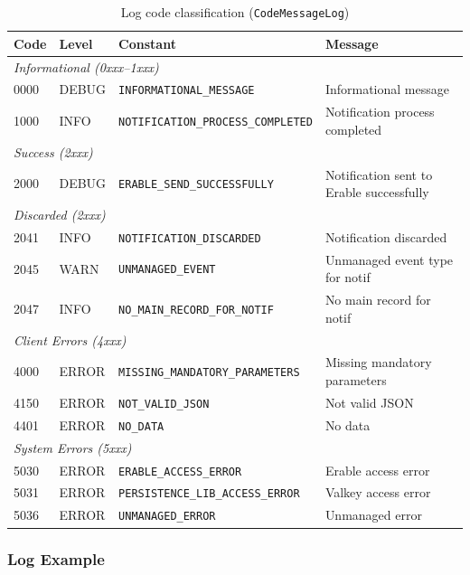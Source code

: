 \begin{table}[H]
    \centering
    \caption{Log code classification (\texttt{CodeMessageLog})}
    \label{tab:log-codes}
    \begin{tabularx}{\textwidth}{l l l X}
\toprule
\textbf{Code} & \textbf{Level} & \textbf{Constant} & \textbf{Message} \\
\midrule
\multicolumn{4}{l}{\textit{Informational (0xxx--1xxx)}} \\
0000 & DEBUG & \texttt{INFORMATIONAL\_MESSAGE} & Informational message \\
1000 & INFO & \texttt{NOTIFICATION\_PROCESS\_COMPLETED} & Notification process completed \\
\midrule
\multicolumn{4}{l}{\textit{Success (2xxx)}} \\
2000 & DEBUG & \texttt{ERABLE\_SEND\_SUCCESSFULLY} & Notification sent to Erable successfully \\
\midrule
\multicolumn{4}{l}{\textit{Discarded (2xxx)}} \\
2041 & INFO & \texttt{NOTIFICATION\_DISCARDED} & Notification discarded \\
2045 & WARN & \texttt{UNMANAGED\_EVENT} & Unmanaged event type for notif \\
2047 & INFO & \texttt{NO\_MAIN\_RECORD\_FOR\_NOTIF} & No main record for notif \\
\midrule
\multicolumn{4}{l}{\textit{Client Errors (4xxx)}} \\
4000 & ERROR & \texttt{MISSING\_MANDATORY\_PARAMETERS} & Missing mandatory parameters \\
4150 & ERROR & \texttt{NOT\_VALID\_JSON} & Not valid JSON \\
4401 & ERROR & \texttt{NO\_DATA} & No data \\
\midrule
\multicolumn{4}{l}{\textit{System Errors (5xxx)}} \\
5030 & ERROR & \texttt{ERABLE\_ACCESS\_ERROR} & Erable access error \\
5031 & ERROR & \texttt{PERSISTENCE\_LIB\_ACCESS\_ERROR} & Valkey access error \\
5036 & ERROR & \texttt{UNMANAGED\_ERROR} & Unmanaged error \\
\bottomrule
    \end{tabularx}
\end{table}

\subsubsection{Log Example}


